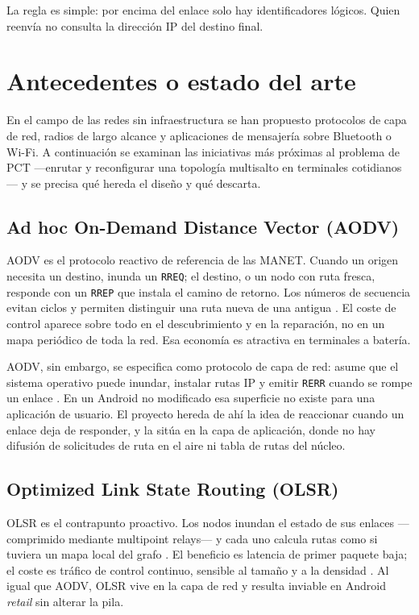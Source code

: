 \documentclass[12pt,oneside]{scrreprt}
\begin{document}
La regla es simple: por encima del enlace solo hay identificadores lógicos. Quien reenvía no consulta la dirección IP del destino final.

\section{Antecedentes o estado del arte}
\label{sec:estado-arte}

En el campo de las redes sin infraestructura se han propuesto protocolos de capa de red, radios de largo alcance y aplicaciones de mensajería sobre Bluetooth o Wi-Fi. A continuación se examinan las iniciativas más próximas al problema de PCT ---enrutar y reconfigurar una topología multisalto en terminales cotidianos--- y se precisa qué hereda el diseño y qué descarta.

\subsection{Ad hoc On-Demand Distance Vector (AODV)}

AODV es el protocolo reactivo de referencia de las MANET. Cuando un origen necesita un destino, inunda un \texttt{RREQ}; el destino, o un nodo con ruta fresca, responde con un \texttt{RREP} que instala el camino de retorno. Los números de secuencia evitan ciclos y permiten distinguir una ruta nueva de una antigua \parencite{Perkins2003,Perkins2001}. El coste de control aparece sobre todo en el descubrimiento y en la reparación, no en un mapa periódico de toda la red. Esa economía es atractiva en terminales a batería.

AODV, sin embargo, se especifica como protocolo de capa de red: asume que el sistema operativo puede inundar, instalar rutas IP y emitir \texttt{RERR} cuando se rompe un enlace \parencite{Perkins2003}. En un Android no modificado esa superficie no existe para una aplicación de usuario. El proyecto hereda de ahí la idea de reaccionar cuando un enlace deja de responder, y la sitúa en la capa de aplicación, donde no hay difusión de solicitudes de ruta en el aire ni tabla de rutas del núcleo.

\subsection{Optimized Link State Routing (OLSR)}

OLSR es el contrapunto proactivo. Los nodos inundan el estado de sus enlaces ---comprimido mediante multipoint relays--- y cada uno calcula rutas como si tuviera un mapa local del grafo \parencite{Clausen2003}. El beneficio es latencia de primer paquete baja; el coste es tráfico de control continuo, sensible al tamaño y a la densidad \parencite{Toh2002}. Al igual que AODV, OLSR vive en la capa de red y resulta inviable en Android \emph{retail} sin alterar la pila.
\end{document}
